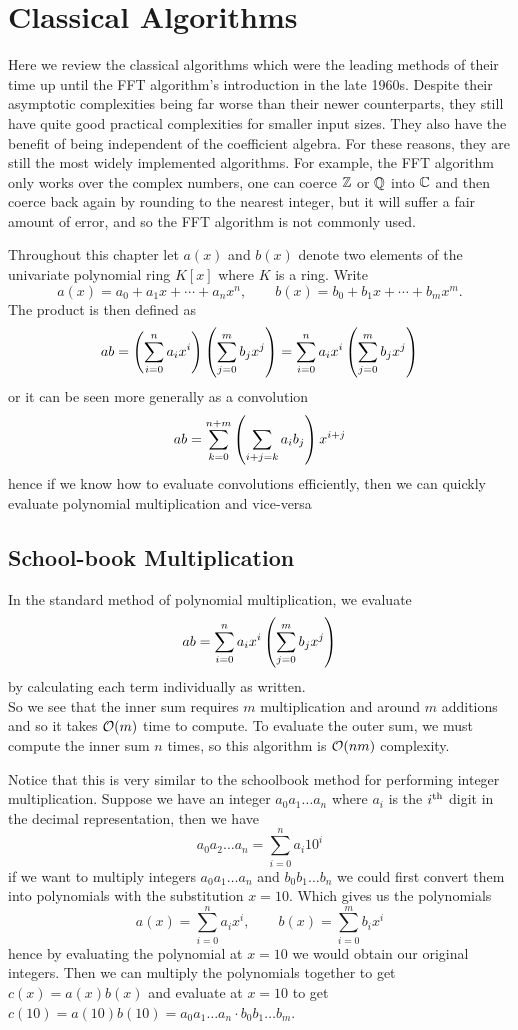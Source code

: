 \chapter{Classical Algorithms}\label{classical algorithms}

Here we review the classical algorithms which were the leading methods of their time up until the FFT algorithm's introduction in the late 1960s. Despite their asymptotic complexities being far worse than their newer counterparts, they still have quite good practical complexities for smaller input sizes. They also have the benefit of being independent of the coefficient algebra. For these reasons, they are still the most widely implemented algorithms. For example, the FFT algorithm only works over the complex numbers, one can coerce ${\mathbb Z}$ or ${\mathbb Q}$ into ${\mathbb C}$ and then coerce back again by rounding to the nearest integer, but it will suffer a fair amount of error, and so the FFT algorithm is not commonly used.

Throughout this chapter let $a(x)$ and $b(x)$ denote two elements of the univariate polynomial ring $K[x]$ where $K$ is a ring.
Write
\[
    a(x) = a_0 + a_1x + \cdots + a_nx^n, \qquad b(x) = b_0 + b_1x + \cdots + b_mx^m.
\]
The product is then defined as
\[
    ab = \left(\sum^n_{i=0} a_i x^i\right)\left(\sum^m_{j=0} b_j x^j\right) = \sum^n_{i=0} a_ix^i\left(\sum^m_{j=0} b_j x^j\right)
\]
or it can be seen more generally as a convolution
\[
    ab = \sum^{n + m}_{k=0} \left(\sum_{i + j = k}a_ib_j\right) x^{i + j}
\]
hence if we know how to evaluate convolutions efficiently, then we can quickly evaluate polynomial multiplication and vice-versa

\section{School-book Multiplication}
\label{sec:prelim-schoolbook}

In the standard method of polynomial multiplication, we evaluate
\[
    ab = \sum^n_{i=0} a_ix^i\left(\sum^m_{j=0} b_j x^j\right)
\]
by calculating each term individually as written.\\
So we see that the inner sum requires $m$ multiplication and around $m$ additions and so it takes $\mathcal O(m)$ time to compute. To evaluate the outer sum, we must compute the inner sum $n$ times, so this algorithm is $\mathcal O(nm)$ complexity.

Notice that this is very similar to the schoolbook method for performing integer multiplication. Suppose we have an integer $a_0a_1 \ldots a_n$ where $a_i$ is the $i^\textrm{th}$ digit in the decimal representation, then we have
\[
    a_0a_2 \ldots a_n = \sum^n_{i=0} a_i 10^i
\]
if we want to multiply integers $a_0a_1\ldots a_n$ and $b_0b_1\ldots b_n$ we could first convert them into polynomials with the substitution $x = 10$. Which gives us the polynomials
\[
    a(x) = \sum^n_{i=0} a_ix^i, \qquad b(x) = \sum^m_{i=0} b_ix^i
\]
hence by evaluating the polynomial at $x = 10$ we would obtain our original integers. Then we can multiply the polynomials together to get $c(x) = a(x)b(x)$ and evaluate at $x = 10$ to get $c(10) = a(10)b(10) = a_0a_1\ldots a_n \cdot b_0b_1\ldots b_m$.

